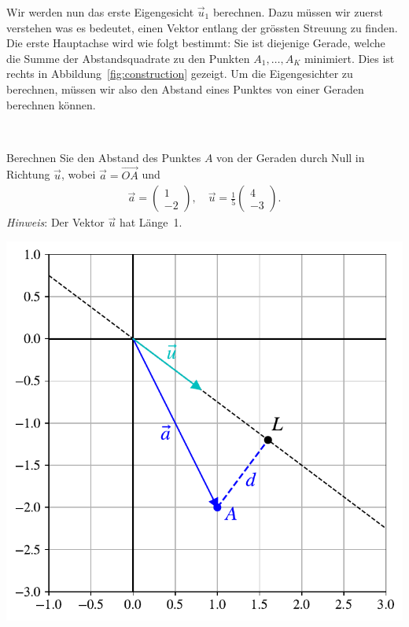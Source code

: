 Wir werden nun das erste Eigengesicht $\vec{u}_1$ berechnen.
Dazu müssen wir zuerst verstehen was es bedeutet, einen Vektor \glqq{}entlang der grössten Streuung\grqq{} zu finden.
Die erste Hauptachse wird wie folgt bestimmt:
Sie ist diejenige Gerade, welche die Summe der Abstandsquadrate zu den Punkten $A_1,\ldots,A_K$ minimiert.
Dies ist rechts in Abbildung~\ref{fig:construction} gezeigt.
Um die Eigengesichter zu berechnen, müssen wir also den Abstand eines Punktes von einer Geraden berechnen können.
\begin{aufgabe} \label{aufg:distance_simple}
	\phantom{text}\\
	\begin{minipage}{0.55\textwidth}
		Berechnen Sie den Abstand des Punktes $A$ von der Geraden durch Null in Richtung $\vec{u}$, wobei $\vec{a}=\overrightarrow{OA}$ und
		\begin{align*}
			\vec{a}=
			\begin{pmatrix}
				1 \\
				-2
			\end{pmatrix},\quad
			\vec{u}=\frac{1}{5}
			\begin{pmatrix}
				4 \\
				-3
			\end{pmatrix}.
		\end{align*}
		\textit{Hinweis}: Der Vektor $\vec{u}$ hat Länge~1.
	\end{minipage}\hfill
	\begin{minipage}{0.4\textwidth}
		\includegraphics[width=\textwidth]{images/facespace/distance_simple}
	\end{minipage}
\end{aufgabe}
